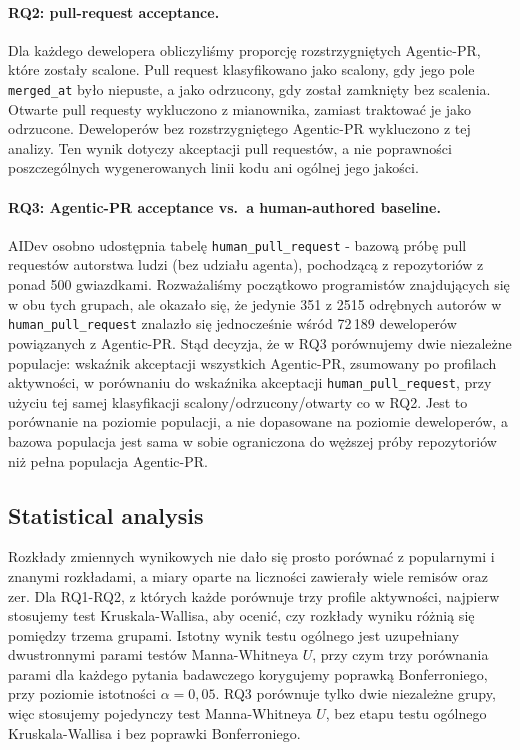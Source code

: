 \paragraph{RQ2: pull-request acceptance.}
Dla każdego dewelopera obliczyliśmy proporcję rozstrzygniętych Agentic-PR, które zostały scalone. Pull request klasyfikowano jako scalony, gdy jego pole \texttt{merged\_at} było niepuste, a jako odrzucony, gdy został zamknięty bez scalenia. Otwarte pull requesty wykluczono z mianownika, zamiast traktować je jako odrzucone. Deweloperów bez rozstrzygniętego Agentic-PR wykluczono z tej analizy. Ten wynik dotyczy akceptacji pull requestów, a nie poprawności poszczególnych wygenerowanych linii kodu ani ogólnej jego jakości.

\paragraph{RQ3: Agentic-PR acceptance vs.\ a human-authored baseline.}
AIDev osobno udostępnia tabelę \texttt{human\_pull\_request} - bazową próbę pull requestów autorstwa ludzi (bez udziału agenta), pochodzącą z repozytoriów z ponad 500 gwiazdkami. Rozważaliśmy początkowo programistów znajdujących się w obu tych grupach, ale okazało się, że jedynie 351 z 2515 odrębnych autorów w \texttt{human\_pull\_request} znalazło się jednocześnie wśród 72\,189 deweloperów powiązanych z Agentic-PR. Stąd decyzja, że w RQ3 porównujemy dwie niezależne populacje: wskaźnik akceptacji wszystkich Agentic-PR, zsumowany po profilach aktywności, w porównaniu do wskaźnika akceptacji \texttt{human\_pull\_request}, przy użyciu tej samej klasyfikacji scalony/odrzucony/otwarty co w RQ2. Jest to porównanie na poziomie populacji, a nie dopasowane na poziomie deweloperów, a bazowa populacja jest sama w sobie ograniczona do węższej próby repozytoriów niż pełna populacja Agentic-PR.

\subsection{Statistical analysis}
Rozkłady zmiennych wynikowych nie dało się prosto porównać z popularnymi i znanymi rozkładami, a miary oparte na liczności zawierały wiele remisów oraz zer. Dla RQ1-RQ2, z których każde porównuje trzy profile aktywności, najpierw stosujemy test Kruskala-Wallisa, aby ocenić, czy rozkłady wyniku różnią się pomiędzy trzema grupami. Istotny wynik testu ogólnego jest uzupełniany dwustronnymi parami testów Manna-Whitneya $U$, przy czym trzy porównania parami dla każdego pytania badawczego korygujemy poprawką Bonferroniego, przy poziomie istotności $\alpha=0,05$. RQ3 porównuje tylko dwie niezależne grupy, więc stosujemy pojedynczy test Manna-Whitneya $U$, bez etapu testu ogólnego Kruskala-Wallisa i bez poprawki Bonferroniego.

